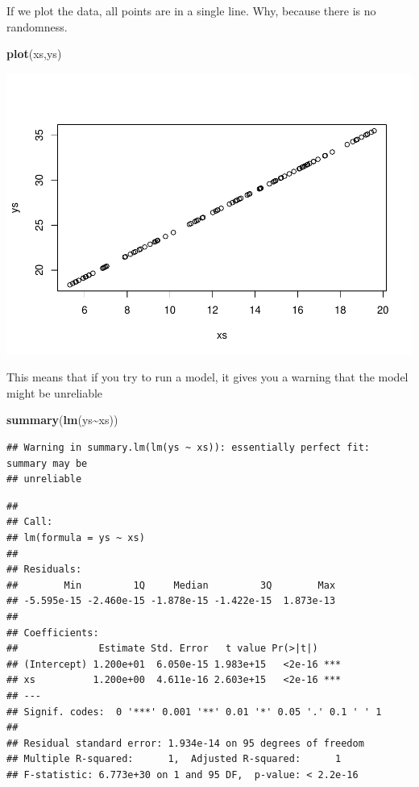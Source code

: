 \documentclass[
]{book}
\newenvironment{Shaded}{\begin{snugshade}}{\end{snugshade}}
\newcommand{\FunctionTok}[1]{\textcolor[rgb]{0.13,0.29,0.53}{\textbf{#1}}}
\newcommand{\NormalTok}[1]{#1}
\newcommand{\SpecialCharTok}[1]{\textcolor[rgb]{0.81,0.36,0.00}{\textbf{#1}}}
\begin{document}
If we plot the data, all points are in a single line. Why, because there is no randomness.

\begin{Shaded}
\begin{Highlighting}[]
\FunctionTok{plot}\NormalTok{(xs,ys)}
\end{Highlighting}
\end{Shaded}

\includegraphics{ECOMODbook_files/figure-latex/a6.23-1.pdf}

This means that if you try to run a model, it gives you a warning that the model might be unreliable

\begin{Shaded}
\begin{Highlighting}[]
\FunctionTok{summary}\NormalTok{(}\FunctionTok{lm}\NormalTok{(ys}\SpecialCharTok{\textasciitilde{}}\NormalTok{xs))}
\end{Highlighting}
\end{Shaded}

\begin{verbatim}
## Warning in summary.lm(lm(ys ~ xs)): essentially perfect fit: summary may be
## unreliable
\end{verbatim}

\begin{verbatim}
## 
## Call:
## lm(formula = ys ~ xs)
## 
## Residuals:
##        Min         1Q     Median         3Q        Max 
## -5.595e-15 -2.460e-15 -1.878e-15 -1.422e-15  1.873e-13 
## 
## Coefficients:
##              Estimate Std. Error   t value Pr(>|t|)    
## (Intercept) 1.200e+01  6.050e-15 1.983e+15   <2e-16 ***
## xs          1.200e+00  4.611e-16 2.603e+15   <2e-16 ***
## ---
## Signif. codes:  0 '***' 0.001 '**' 0.01 '*' 0.05 '.' 0.1 ' ' 1
## 
## Residual standard error: 1.934e-14 on 95 degrees of freedom
## Multiple R-squared:      1,  Adjusted R-squared:      1 
## F-statistic: 6.773e+30 on 1 and 95 DF,  p-value: < 2.2e-16
\end{verbatim}
\end{document}
